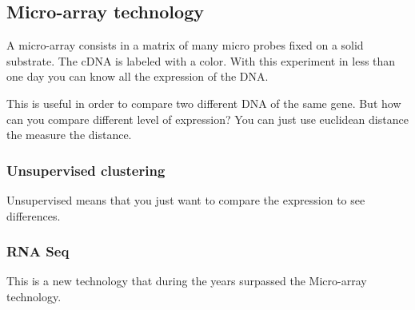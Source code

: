 \subsection{Micro-array technology}

A micro-array consists in a matrix of many micro probes fixed on a solid 
substrate.
The cDNA is labeled with a color. With this experiment in less than one day you 
can know all the expression of the DNA.

This is useful in order to compare two different DNA of the same gene.
But how can you compare different level of expression? You can just use 
euclidean distance the measure the distance.

\subsubsection{Unsupervised clustering}
Unsupervised means that you just want to compare the expression to see 
differences.

\subsubsection{RNA Seq}
This is a new technology that during the years surpassed the Micro-array 
technology.